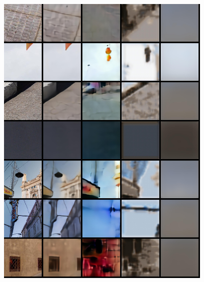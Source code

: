 \begin{appendices}
\begin{figure}
    \includegraphics[width=0.92\textwidth]{figures/ptz/test_stacked_2}
\end{figure}
\begin{figure}
    \centering

\end{figure}
\end{appendices}
